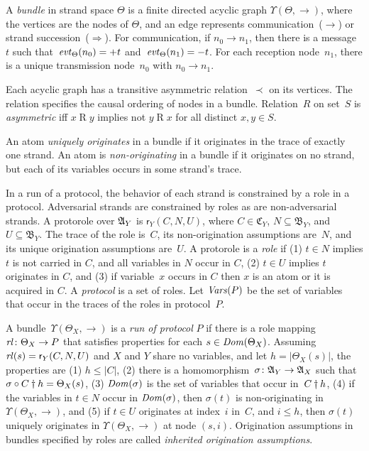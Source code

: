 \documentclass[12pt]{article}
\theoremstyle{definition}
\newcommand{\alga}{\alg{A}}
\newcommand{\tr}{\ensuremath{\mathfrak C}}
\newcommand{\base}{\ensuremath{\mathfrak B}}
\newcommand{\sdom}{\fn{Dom}}
\newcommand{\svars}{\fn{Vars}}
\newcommand{\evt}{\fn{evt}}
\newcommand{\role}{\mathsf{r}}
\newcommand{\rl}{\fn{rl}}
\begin{document}
A \emph{bundle} in strand space $\Theta$ is a finite directed
acyclic graph $\Upsilon(\Theta,\to)$, where the vertices are the nodes
of $\Theta$, and an edge represents communication~($\rightarrow$) or
strand succession~($\Rightarrow$).  For communication, if
$n_0\rightarrow n_1$, then there is a message~$t$ such
that~$\evt_\Theta(n_0)=\outbnd t$ and~$\evt_\Theta(n_1)=\inbnd t$.
For each reception node~$n_1$, there is a unique transmission
node~$n_0$ with $n_0\rightarrow n_1$.

Each acyclic graph has a transitive asymmetric relation~$\prec$ on its
vertices.  The relation specifies the causal ordering of nodes in a
bundle.  Relation~$R$ on set~$S$ is \emph{asymmetric} iff
$x\mathbin{R}y$ implies not $y\mathbin{R}x$ for all distinct $x,y \in
S$.

An atom \emph{uniquely originates} in a bundle if it originates in
the trace of exactly one strand.  An atom is \emph{non-originating} in
a bundle if it originates on no strand, but each of its variables
occurs in some strand's trace.

In a run of a protocol, the behavior of each strand is constrained by
a role in a protocol.  Adversarial strands are constrained by roles as
are non-adversarial strands.  A protorole over $\alga_Y$ is
$\role_Y(C,N,U)$, where $C\in\tr_Y$, $N\subseteq\base_Y$, and
$U\subseteq\base_Y$.  The trace of the role is~$C$, its
non-origination assumptions are~$N$, and its unique origination
assumptions are~$U$.  A protorole is a \emph{role} if (1) $t\in N$
implies $t$ is not carried in $C$, and all variables in $N$ occur in
$C$, (2) $t\in U$ implies $t$ originates in $C$, and (3) if
variable~$x$ occurs in $C$ then $x$ is an atom or it is acquired in
$C$.  A \emph{protocol} is a set of roles.  Let $\svars(P)$ be the set
of variables that occur in the traces of the roles in protocol~$P$.

A bundle~$\Upsilon(\Theta_X,\to)$ is a \emph{run of protocol} $P$ if
there is a role mapping $\rl\colon\Theta_X\to P$ that satisfies
properties for each $s\in\sdom(\Theta_X)$.  Assuming
$\rl(s)=\role_Y(C,N,U)$ and $X$ and $Y$ share no variables, and let
$h=|\Theta_X(s)|$, the properties are (1) $h\leq|C|$, (2) there is a
homomorphism~$\sigma\colon\alga_Y\to\alga_X$ such that
${\mathord{\sigma}}\circ{\mathord{C\dagger h}}=\Theta_X(s)$, (3) $\sdom(\sigma)$ is the
set of variables that occur in~$C\dagger h$, (4) if the variables
in $t\in N$ occur in $\sdom(\sigma)$, then $\sigma(t)$ is
non-originating in $\Upsilon(\Theta_X,\to)$, and (5) if $t\in U$
originates at index~$i$ in~$C$, and $i\leq h$, then $\sigma(t)$
uniquely originates in $\Upsilon(\Theta_X,\to)$ at node $(s,i)$.
Origination assumptions in bundles specified by roles are called
\emph{inherited origination assumptions}.
\end{document}
